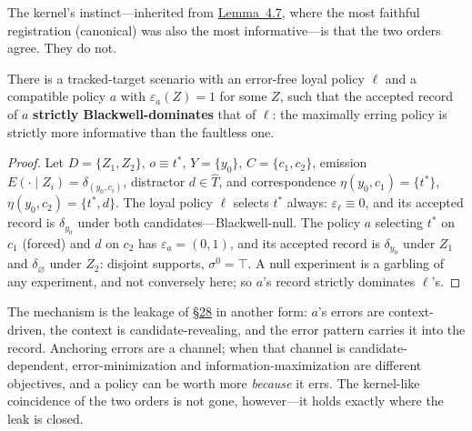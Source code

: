 The kernel's instinct---\hspace{0pt}inherited from \hyperlink{stmt:4.7}{Lemma~4.7}, where the most faithful registration (canonical) was also the most informative---\hspace{0pt}is that the two orders agree. They do not.


\begin{thmplain}

There is a tracked-target scenario with an error-free loyal policy \(\ell\) and a compatible policy \(a\) with \(\varepsilon_a(Z) = 1\) for some \(Z\), such that the accepted record of \(a\) \textbf{strictly Blackwell-dominates} that of \(\ell\): the maximally erring policy is strictly more informative than the faultless one.
\end{thmplain}

\begin{proof}

Let \(D = \{Z_1, Z_2\}\), \(o \equiv t^*\), \(Y = \{y_0\}\), \(C = \{c_1, c_2\}\), emission \(E(\cdot \mid Z_i) = \delta_{(y_0, c_i)}\), distractor \(d \in \widehat{T}\), and correspondence \(\eta(y_0, c_1) = \{t^*\}\), \(\eta(y_0, c_2) = \{t^*, d\}\). The loyal policy \(\ell\) selects \(t^*\) always: \(\varepsilon_\ell \equiv 0\), and its accepted record is \(\delta_{y_0}\) under both candidates---\hspace{0pt}Blackwell-null. The policy \(a\) selecting \(t^*\) on \(c_1\) (forced) and \(d\) on \(c_2\) has \(\varepsilon_a = (0, 1)\), and its accepted record is \(\delta_{y_0}\) under \(Z_1\) and \(\delta_{\varnothing}\) under \(Z_2\): disjoint supports, \(\sigma^0 = \top\). A null experiment is a garbling of any experiment, and not conversely here; so \(a\)'s record strictly dominates \(\ell\)'s.
\end{proof}

The mechanism is the leakage of \hyperlink{sec:28}{§28} in another form: \(a\)'s errors are context-driven, the context is candidate-revealing, and the error pattern carries it into the record. Anchoring errors are a channel; when that channel is candidate-dependent, error-minimization and information-maximization are different objectives, and a policy can be worth more \emph{because} it errs. The kernel-like coincidence of the two orders is not gone, however---\hspace{0pt}it holds exactly where the leak is closed.

